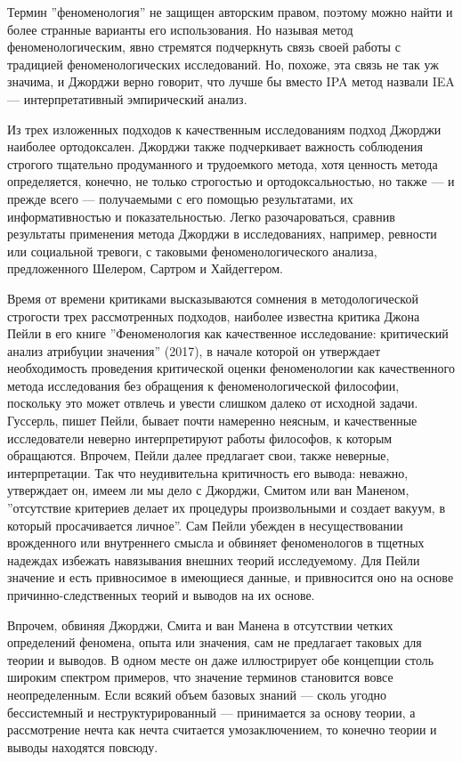 \documentclass[11pt]{book}
\begin{document}
Термин ''феноменология'' не защищен авторским правом, поэтому можно найти и более странные варианты его использования. Но называя метод феноменологическим, явно стремятся подчеркнуть связь своей работы с традицией феноменологических исследований. Но, похоже, эта связь не так уж значима, и Джорджи верно говорит, что лучше бы вместо IPA метод назвали IEA --- интерпретативный эмпирический анализ.

Из трех изложенных подходов к качественным исследованиям подход Джорджи наиболее ортодоксален. Джорджи также подчеркивает важность соблюдения строгого тщательно продуманного и трудоемкого метода, хотя ценность метода определяется, конечно, не только строгостью и ортодоксальностью, но также --- и прежде всего --- получаемыми с его помощью результатами, их информативностью и показательностью. Легко разочароваться, сравнив результаты применения метода Джорджи в исследованиях, например, ревности или социальной тревоги, с таковыми феноменологического анализа, предложенного Шелером, Сартром и Хайдеггером.

Время от времени критиками высказываются сомнения в методологической строгости трех рассмотренных подходов, наиболее известна критика Джона Пейли в его книге ''Феноменология как качественное исследование: критический анализ атрибуции значения'' (2017), в начале которой он утверждает необходимость проведения критической оценки феноменологии как качественного метода исследования без обращения к феноменологической философии, поскольку это может отвлечь и увести слишком далеко от исходной задачи. Гуссерль, пишет Пейли, бывает почти намеренно неясным, и качественные исследователи неверно интерпретируют работы философов, к которым обращаются. Впрочем, Пейли далее предлагает свои, также неверные, интерпретации. Так что неудивительна критичность его вывода: неважно, утверждает он, имеем ли мы дело с Джорджи, Смитом или ван Маненом, ''отсутствие критериев делает их процедуры произвольными и создает вакуум, в который просачивается личное''. Сам Пейли убежден в несуществовании врожденного или внутреннего смысла и обвиняет феноменологов в тщетных надеждах избежать навязывания внешних теорий исследуемому. Для Пейли значение и есть привносимое в имеющиеся данные, и привносится оно на основе причинно-следственных теорий и выводов на их основе.

Впрочем, обвиняя Джорджи, Смита и ван Манена в отсутствии четких определений феномена, опыта или значения, сам не предлагает таковых для теории и выводов. В одном месте он даже иллюстрирует обе концепции столь широким спектром примеров, что значение терминов становится вовсе неопределенным. Если всякий объем базовых знаний --- сколь угодно бессистемный и неструктурированный --- принимается за основу теории, а рассмотрение нечта как нечта считается умозаключением, то конечно теории и выводы находятся повсюду.
\end{document}
